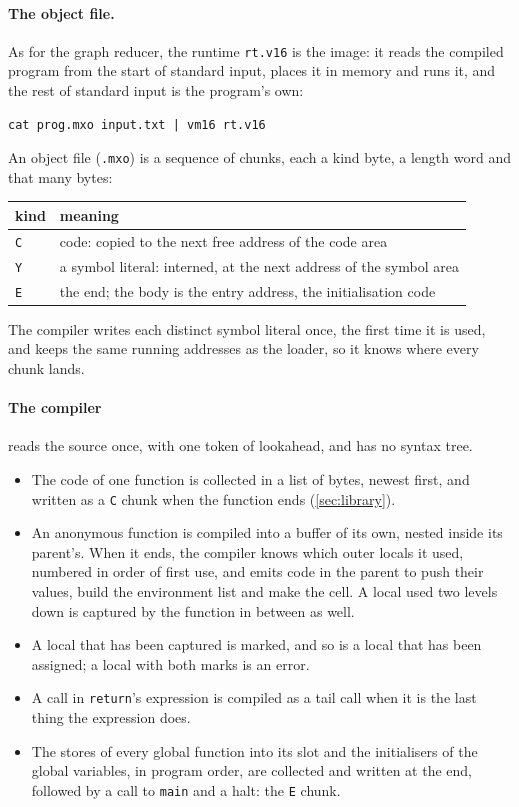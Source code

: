 \documentclass[11pt,a4paper]{article}
\begin{document}
\paragraph{The object file.} As for the graph reducer, the runtime
\texttt{rt.v16} is the image: it reads the compiled program from the start
of standard input, places it in memory and runs it, and the rest of standard
input is the program's own:
\begin{lstlisting}[style=shell]
cat prog.mxo input.txt | vm16 rt.v16
\end{lstlisting}
An object file (\texttt{.mxo}) is a sequence of chunks, each a kind byte, a
length word and that many bytes:
\begin{center}
\small
\begin{tabular}{@{}l l@{}}
\toprule
kind & meaning\\
\midrule
\texttt{C} & code: copied to the next free address of the code area\\
\texttt{Y} & a symbol literal: interned, at the next address of the symbol area\\
\texttt{E} & the end; the body is the entry address, the initialisation code\\
\bottomrule
\end{tabular}
\end{center}
The compiler writes each distinct symbol literal once, the first time it is
used, and keeps the same running addresses as the loader, so it knows where
every chunk lands.

\paragraph{The compiler} reads the source once, with one token of lookahead,
and has no syntax tree.
\begin{itemize}[nosep]
\item The code of one function is collected in a list of bytes, newest
  first, and written as a \texttt{C} chunk when the function ends
  (\cref{sec:library}).
\item An anonymous function is compiled into a buffer of its own, nested
  inside its parent's. When it ends, the compiler knows which outer locals
  it used, numbered in order of first use, and emits code in the parent to
  push their values, build the environment list and make the cell. A local
  used two levels down is captured by the function in between as well.
\item A local that has been captured is marked, and so is a local that has
  been assigned; a local with both marks is an error.
\item A call in \verb|return|'s expression is compiled as a tail call when
  it is the last thing the expression does.
\item The stores of every global function into its slot and the initialisers
  of the global variables, in program order, are collected and written at
  the end, followed by a call to \texttt{main} and a halt: the \texttt{E}
  chunk.
\end{itemize}
\end{document}
